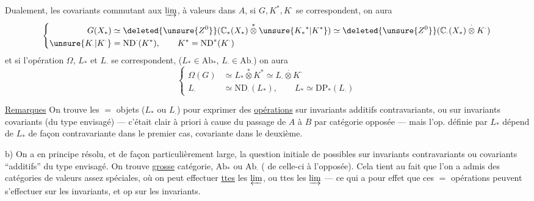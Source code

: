 Dualement,  les   covariants
commutant aux $\varinjlim$, à valeurs dans
$A$, si $G,K^*,K^\cdot$ se correspondent,
on aura
\[
\left\{\begin{aligned}
G(X_*)&\simeq\deleted{\unsure{Z^0}}(\mathbb C_*(X_*)\mathbin{\overset{*}{\otimes}}\unsure{{K_*}^*|K^*})
\simeq\deleted{\unsure{Z^0}}(\mathbb C_\cdot(X_*)\mathbin{\overset{\cdot}{\otimes}}K^\cdot)\\
\unsure{K_\cdot|K^\cdot}&=\mathrm{ND}^{\cdot}(K^*),\qquad K^*=\mathrm{ND}^*(K^\cdot)
\end{aligned}\right.
\]
et si l'opération $\Omega$, $L_*$ et $L_\cdot$ se
correspondent, ($L_*\in\mathrm{Ab}_*$, $L_\cdot\in\mathrm{Ab}_\cdot$)
on aura
\[
\left\{\begin{aligned}
\Omega(G)&\simeq L_*\mathbin{\overset{*}{\otimes}}K^*\simeq L_\cdot\mathbin{\overset{\cdot}{\otimes}}K^\cdot\\
L_\cdot&\simeq\mathrm{ND}_\cdot(L_*),\qquad L_*\simeq\mathrm{DP}_*(L_\cdot)
\end{aligned}\right.
\]

\uline{Remarques}  On trouve 
les $=$ objets ($L_*$ ou $L_\cdot$) pour exprimer
des \uline{opérations} sur invariants additifs
contravariants, ou sur invariants  covariants
(du type envisagé) --- c'était
clair à priori à cause du passage
de $A$ à $B$ par  catégorie opposée
--- mais l'op. définie par $L_*$ dépend
de $L_*$ de façon contravariante dans le
premier cas, covariante dans le deuxième.

b) On a en principe résolu, et de façon
particulièrement large, la question initiale
de  possibles sur
invariants contravariants ou covariants
``additifs'' du type envisagé. On trouve 
\inserted{$\unsure{=}$} \uline{grosse} catégorie, $\mathrm{Ab}_*$ ou $\mathrm{Ab}_\cdot$ (
 de celle-ci à l'opposée). Cela
tient au fait que l'on a admis
des catégories  de valeurs  assez spéciales,
 où on peut effectuer \uline{ttes}
les $\varprojlim$, ou ttes les $\varinjlim$ --- ce
qui a pour effet que ces $=$ opérations
peuvent s'effectuer sur les 
invariants, et op sur les invariants.

